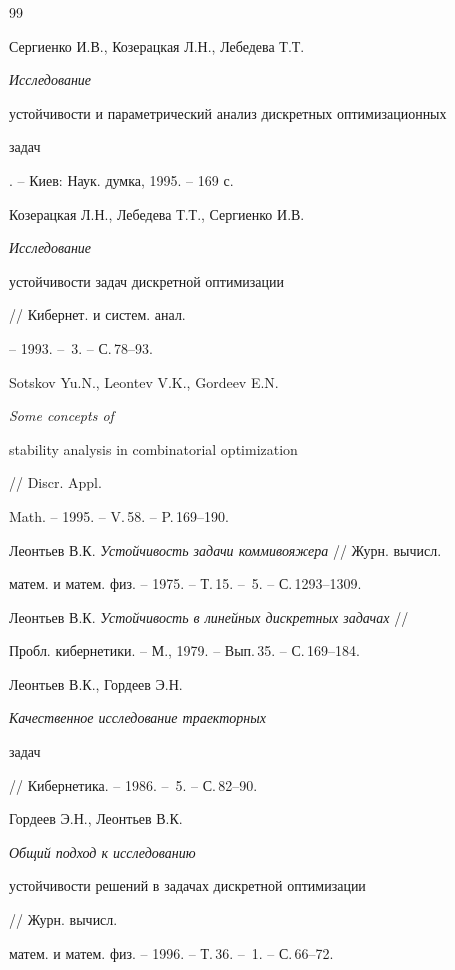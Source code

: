  


 


\begin{thebibliography}{99} 


 




Сергиенко И.В., Козерацкая Л.Н., Лебедева Т.Т. {\em Исследование 


устойчивости и параметрический анализ дискретных оптимизационных 


задач}. -- Киев: Наук. думка, 1995. -- 169 с. 




Козерацкая Л.Н., Лебедева Т.Т., Сергиенко И.В. {\em Исследование 


устойчивости задач дискретной оптимизации} // Кибернет. и систем. анал. 


-- 1993. -- \No\,3. -- С.\,78--93. 




Sotskov Yu.N., Leontev V.K., Gordeev E.N. {\em Some concepts of 


stability analysis in combinatorial optimization} // Discr. Appl. 


Math. -- 1995. -- V.\,58. -- P.\,169--190. 




Леонтьев В.К. {\em Устойчивость задачи коммивояжера} // Журн. вычисл. 


матем. и матем. физ. -- 1975. -- Т.\,15. -- \No\,5. -- С.\,1293--1309. 




Леонтьев В.К. {\em Устойчивость в линейных дискретных задачах} //


Пробл. кибернетики. -- М., 1979. -- Вып.\,35. -- С.\,169--184. 




Леонтьев В.К., Гордеев Э.Н. {\em Качественное исследование траекторных 


задач} // Кибернетика. -- 1986. -- \No\,5. -- С.\,82--90. 




Гордеев Э.Н., Леонтьев В.К. {\em Общий подход к исследованию 


устойчивости решений в задачах дискретной оптимизации} // Журн. вычисл. 


матем. и матем. физ. -- 1996. -- Т.\,36. -- \No\,1. -- С.\,66--72. 





\end{thebibliography}
